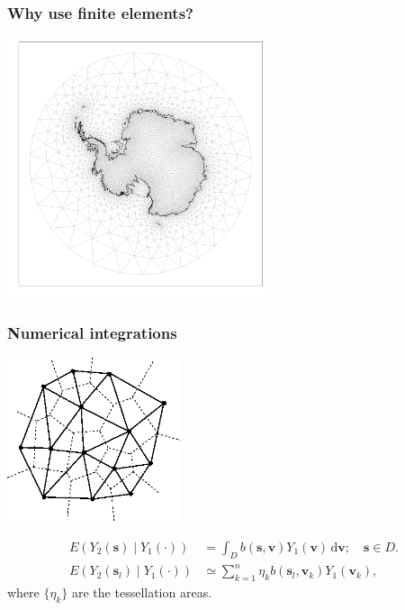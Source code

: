 \documentclass{beamer}
\newcommand{\svec} {\textbf{s}}
\newcommand{\s}{\mathbf{s}}
\renewcommand{\v}{\mathbf{v}}
\renewcommand{\d}{\mathrm{d}}
\newcommand{\E}{E}
\begin{document}

 \begin{frame}
 \frametitle{Why use finite elements?}

 \begin{center}
 \includegraphics[width=3in]{ice_mesh.png}
 \end{center}

 \end{frame}


\begin{frame}
\frametitle{Numerical integrations}

\vspace{-1cm}

\begin{center}
\includegraphics[width=2in]{vor3.png}
\end{center}

\vspace{-1.5cm}

\begin{align*}
\E\left(Y_2(\s)\mid Y_1(\cdot)\right)&=\int_D{b(\s,\v)Y_1(\v)\,\d \v};\quad \s\in D.\\
\E(Y_2(\svec_l) \mid  Y_1(\cdot)) &\simeq \sum_{k=1}^{n} \eta_k b(\svec_l,\v_k)Y_1(\v_k),
\end{align*}
where $\{\eta_k\}$ are the tessellation areas.
\end{frame}
\end{document}
